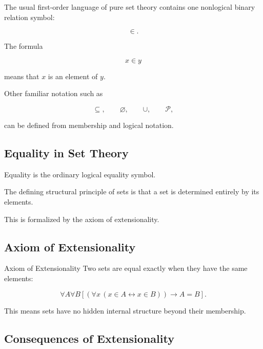 The usual first-order language of pure set theory contains one
nonlogical binary relation symbol:

\[
\boxed{
\in.
}
\]

The formula

\[
x\in y
\]

means that \(x\) is an element of \(y\).

Other familiar notation such as

\[
\subseteq,
\qquad
\varnothing,
\qquad
\cup,
\qquad
\mathcal{P},
\]

can be defined from membership and logical notation.

\subsection{Equality in Set Theory}
\label{subsec:set-theoretic-equality}

Equality is the ordinary logical equality symbol.

The defining structural principle of sets is that a set is determined
entirely by its elements.

This is formalized by the axiom of extensionality.

\subsection{Axiom of Extensionality}
\label{subsec:axiom-extensionality}

\begin{definitionbox}{Axiom of Extensionality}
Two sets are equal exactly when they have the same elements:

\[
\boxed{
\forall A\forall B
\left[
\left(
\forall x
\,
(x\in A\leftrightarrow x\in B)
\right)
\rightarrow
A=B
\right].
}
\]
\end{definitionbox}

This means sets have no hidden internal structure beyond their membership.

\subsection{Consequences of Extensionality}
\label{subsec:extensionality-consequences}


